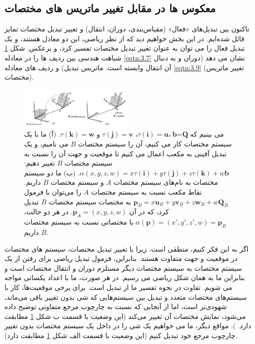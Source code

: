 \subsection{\textbf{معکوس ها در مقابل تغییر ماتریس های مختصات}}
{
    \Large
    \begin{spacing}{1.5}
        تاکنون بین تبدیل‌های «فعال» (مقیاس‌بندی، دوران، انتقال) و تغییر تبدیل مختصات تمایز قائل شده‌ایم.
        در این بخش خواهیم دید که از نظر ریاضی، این دو معادل هستند، و یک تبدیل فعال را می توان به عنوان تغییر تبدیل مختصات تفسیر کرد، و برعکس.
        شکل \ref{fig:4.Session.1.3.15} شباهت هندسی بین ردیف ها را در معادله \ref{eqtn:3.7} نشان می دهد (دوران و به دنبال آن انتقال وابسته است. ماتریس تبدیل) و ردیف های معادله \ref{eqtn:3.9} (تغییر ماتریس مختصات).

        \begin{figure}[H]
            \centering
            \setlength{\belowcaptionskip}{-10pt}
            \includegraphics[width=0.5\textwidth]{Images/4/3/4.Session.1.3.15}
            \caption {می بینیم که$\textbf{b}=\textbf{Q}$،$\tau(\textbf{i})=\textbf{u}$، $\tau(\textbf{j})=\textbf{v}$ و $\tau(\textbf{k})=\textbf{w}$.
                (آ) ما با یک سیستم مختصات کار می کنیم، آن را سیستم مختصات $B$ می نامیم، و یک تبدیل آفینی به مکعب اعمال می کنیم
                تا موقعیت و جهت آن را نسبت به سیستم مختصات $B$ تغییر دهیم: $\alpha(x,y,z,w)=x\tau(\textbf{i})+y\tau(\textbf{j})+z\tau(\textbf{k})+w\textbf{b}$.
                (ب) ما دو سیستم مختصات به نام‌های سیستم مختصات $A$ و سیستم مختصات $B$ داریم.
                نقاط مکعب نسبت به سیستم مختصات $A$ را می‌توان با فرمول $\textbf{p}_{B}=x\textbf{u}_{B}+y\textbf{v}_{B}+z\textbf{w}_{B}+w\textbf{Q}_{B}$ به مختصات سیستم مختصات $B$ تبدیل کرد، که در آن $\textbf{p}_{A}=(x,y,z,w)$.
                در هر دو حالت، $\alpha(\textbf{p})=(x\prime,y\prime,z\prime,w)=\textbf{p}_{B}$ با مختصاتی نسبت به سیستم مختصات $B$ داریم.}
            \label{fig:4.Session.1.3.15}
        \end{figure}

        اگر به این فکر کنیم، منطقی است. زیرا با تغییر تبدیل مختصات، سیستم های مختصات در موقعیت و جهت متفاوت هستند.
        بنابراین، فرمول تبدیل ریاضی برای رفتن از یک سیستم مختصات به سیستم مختصات دیگر مستلزم دوران و انتقال مختصات است
        و بنابراین ما به همان شکل ریاضی می رسیم. در هر صورت، ما با اعداد یکسانی مواجه می شویم.
        تفاوت در نحوه تفسیر ما از تبدیل است. برای برخی موقعیت‌ها، کار با سیستم‌های مختصات متعدد و تبدیل بین سیستم‌هایی که شی بدون تغییر باقی می‌ماند، شهودی‌تر است،
        اما از آنجایی که نسبت به چارچوب مرجع متفاوتی توضیح داده می‌شود، نمایش مختصات آن تغییر می‌کند (این وضعیت با قسمت ب شکل \ref{fig:4.Session.1.3.15} مطابقت دارد. ).
        مواقع دیگر، ما می خواهیم یک شی را در داخل یک سیستم مختصات بدون تغییر چارچوب مرجع خود تبدیل کنیم (این وضعیت با قسمت الف شکل \ref{fig:4.Session.1.3.15} مطابقت دارد).


\end{spacing}}
